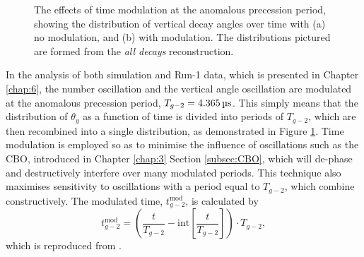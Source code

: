 \begin{figure}[b!]
\centering{}
\caption{The effects of time modulation at the anomalous precession period, showing the distribution of vertical decay angles over time with (a) no modulation, and (b) with modulation. The distributions pictured are formed from the \textit{all decays} reconstruction.}
\label{fig:TimeModulation}
\end{figure}  

In the analysis of both simulation and Run-1 data, which is presented in Chapter \ref{chap:6}, the number oscillation and the vertical angle oscillation are modulated at the anomalous precession period, $T_{g-2} = \text{\SI{4.365}{\micro\second}}$. This simply means that the distribution of $\theta_{y}$ as a function of time is divided into periods of $T_{g-2}$, which are then recombined into a single distribution, as demonstrated in Figure \ref{fig:TimeModulation}. Time modulation is employed so as to minimise the influence of oscillations such as the CBO, introduced in Chapter \ref{chap:3} Section \ref{subsec:CBO}, which will de-phase and destructively interfere over many modulated periods. This technique also maximises sensitivity to oscillations with a period equal to $T_{g-2}$, which combine constructively. The modulated time, $t_{g-2}^\text{mod}$, is calculated by 
%
\begin{equation}
  t_{g-2}^{\text{mod}} = \left(\frac{t}{T_{g-2}}-\text{int}\left[\frac{t}{T_{g-2}}\right]\right)\cdot T_{g-2},
  \label{eqn:TimeMod}
\end{equation}
%
which is reproduced from \cite{Lukicov}.


